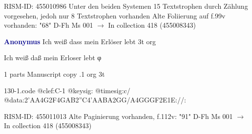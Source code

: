 \documentclass[twocolumn]{book}
\begin{document}
\newline RISM-ID: 455010986
\newline Unter den beiden Systemen 15 Textstrophen durch Zählung vorgesehen, jedoh nur 8 Textstrophen vorhanden
\newline Alte Foliierung auf f.99v vorhanden: "68"
\newline D-Fh  Ms 001
\newline $\rightarrow$ In collection 418 (455008343)

\newline \par \vspace{7pt} \textcolor{darkblue}{\textbf{Anonymus  }}
\newline Ich weiß dass mein Erlöser lebt  3t  
\newline org
\newline \begin{itshape}[f.112v, heading:] Ich weiß daß mein Erloser lebt φ\end{itshape} 
\newline \textcolor{darkblue}{}  1 parts  
\newline Manuscript copy
.1  org  3t  
\begin{filecontents*}{130-1.code}
@clef:C-1
@keysig:
@timesig:c/
@data:2'AA4G2F4GAB2''C4'AABA2GG/A4GGGF2E1E://:
\end{filecontents*}
\newline
%

\newline RISM-ID: 455011013
\newline Alte Paginierung vorhanden, f.112v: "91"
\newline D-Fh  Ms 001
\newline $\rightarrow$ In collection 418 (455008343)
\end{document}
